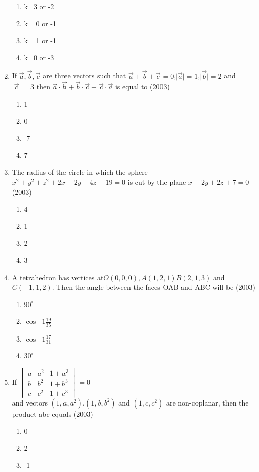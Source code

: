 \documentclass[12pt]{article}
\begin{document}
\begin{enumerate}
\begin{enumerate}
\item k=3 or -2
\item k= 0 or -1
\item k= 1 or -1
\item k=0 or -3
\end{enumerate}
\item If $\vec{a},\vec{b} ,\vec{c}$ are three vectors such that $\vec{a}+\vec{b}+\vec{c}=0$,$\mid \vec{a} \mid=1$,$\mid \vec{b} \mid=2$ and $\mid \vec{c} \mid=3$ then $\vec{a}\cdot\vec{b}+\vec{b}\cdot\vec{c}+\vec{c}\cdot\vec{a}$ is equal to (2003)
\begin{enumerate}
\item 1
\item 0
\item -7 
\item 7
\end{enumerate}
\item The radius of the circle in which the sphere $x^2+y^2+z^2+2x-2y-4z-19=0$ is cut by the plane $x+2y+2z+7=0$ (2003)
\begin{enumerate}
\item 4
\item 1
\item 2 
\item 3
\end{enumerate}
\item A tetrahedron has vertices at$O(0,0,0),A(1,2,1)B(2,1,3)$ and $C(-1,1,2)$. Then the angle between the faces OAB and ABC will be (2003)
\begin{enumerate}
\item $90^\circ$ 
\item $\cos^-{1}\frac{19}{35}$ 
\item $\cos^-{1}\frac{17}{31}$ 
\item $30^\circ$ 
\end{enumerate}
\item If $\begin{vmatrix}
 a & a^2  & 1+a^3\\
 b   & b^2 & 1+b^3\\
 c    & c^2 & 1+c^3
\end{vmatrix}=0$ \\ and vectors $(1,a,a^2)$,$(1,b,b^2)$ and $(1,c,c^2)$ are non-coplanar, then the product abc equals (2003)
\begin{enumerate}
\item 0
\item 2
\item -1

\end{enumerate}
\end{enumerate}
\end{document}
